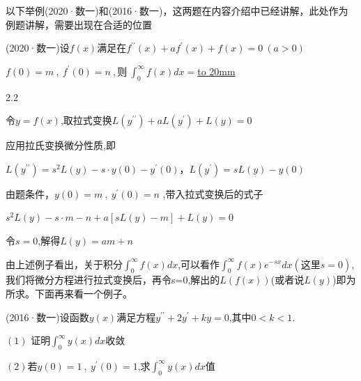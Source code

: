 以下举例(2020·数一)和(2016·数一)，这两题在内容介绍中已经讲解，此处作为例题讲解，需要出现在合适的位置

\vspace{10pt}

 (2020·数一)设$f(x)$满足在$f^{\prime\prime}\left(x\right)+af^{\prime}\left(x\right)+f\left(x\right)=0\:\left(a>0\right)$

\hspace{3em}$f\left(0\right)=m\:,\:f^{\prime}\left(0\right)=n\:,则\:\int_{0}^{\infty}f\left(x\right)dx=$\underline{\hbox to 20mm{}}

\vspace{-10pt}

\begin{spacing}{2.2}
	\begin{center}
		
		 \hspace{0.5em} 令$y=f(x)$,取拉式变换\hspace{1em}$L\left(y^{\prime\prime}\right)+aL\left(y^{\prime}\right)+L\left(y\right)=0$
		
		应用拉氏变换微分性质,即
		
		$L\left(y^{\prime\prime}\right)=s^{2}L\left(y\right)-s\cdot y\left(0\right)-y^{\prime}\left(0\right)$，$L\left(y^{\prime}\right)=sL\left(y\right)-y\left(0\right)$
		
		由题条件，$y\left(0\right)=m\:,\:y^{\prime}\left(0\right)=n$ ,带入拉式变换后的式子
		
		$s^{2}L\left(y\right)-s\cdot m-n+a\left\lbrack sL\left(y\right)-m\right\rbrack+L\left(y\right)=0$
		
		令$s=0$,解得$L(y)=am+n$
	\end{center}
\end{spacing}



由上述例子看出，关于积分$\int_{0}^{\infty}f\left(x\right)dx$,可以看作$\int_{0}^{\infty}f\left(x\right)e^{-sx}dx (这里s=0)$,我们将微分方程进行拉式变换后，再令s=0,解出的$L(f(x))$(或者说$L(y)$)即为所求。下面再来看一个例子。

\vspace{10pt}

 (2016·数一)设函数$y(x)$满足方程$y^{\prime\prime}+2y^{\prime}+ky=0$,其中$0<k<1$.

$(1)$ 证明$\int_{0}^{\infty}y\left(x\right)dx$收敛

$(2)$若$y\left(0\right)=1\:,\:y^{\prime}\left(0\right)=1$,求$\int_{0}^{\infty}y\left(x\right)dx$值

